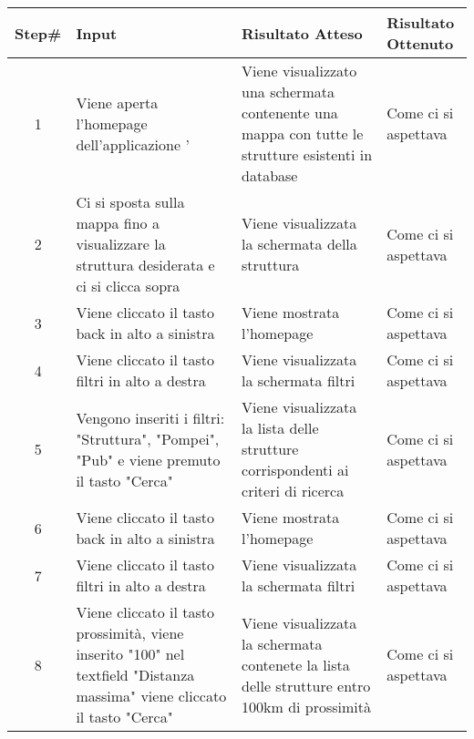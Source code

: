 \begin{table}[H]
    \footnotesize
    \begin{tabularx}{\textwidth}{|c|X|X|X|}
        \hline
        Step\# & Input & Risultato Atteso & Risultato Ottenuto \\
        \hline
         1 & Viene aperta l'homepage dell'applicazione '
         & Viene visualizzato una schermata contenente una mappa con tutte le strutture esistenti in database
         &Come ci si aspettava \\
          \hline
        2 & Ci si sposta sulla mappa fino a visualizzare la struttura desiderata e ci si clicca sopra
        & Viene visualizzata la schermata della struttura
        & Come ci si aspettava\\
         \hline 
        3 & Viene cliccato il tasto back in alto a sinistra
         & Viene mostrata l'homepage & Come ci si aspettava\\
          \hline
        4 & Viene cliccato il tasto filtri in alto a destra
         & Viene visualizzata la schermata filtri
         & Come ci si aspettava\\
          \hline 
        5 & Vengono inseriti i filtri: "Struttura", "Pompei", "Pub" e viene premuto il tasto "Cerca"
         & Viene visualizzata la lista delle strutture corrispondenti ai criteri di ricerca
         & Come ci si aspettava\\
          \hline 
        6 & Viene cliccato il tasto back in alto a sinistra
          & Viene mostrata l'homepage
          & Come ci si aspettava\\
           \hline      
        7 & Viene cliccato il tasto filtri in alto a destra
        & Viene visualizzata la schermata filtri
        & Come ci si aspettava\\
        \hline       
        
        8 & Viene cliccato il tasto prossimità, viene inserito "100" nel textfield "Distanza massima" viene cliccato il tasto "Cerca"
        & Viene visualizzata la schermata contenete la lista delle strutture entro 100km di prossimità
        & Come ci si aspettava\\
        \hline 
        
    \end{tabularx}
\end{table}
    
       
